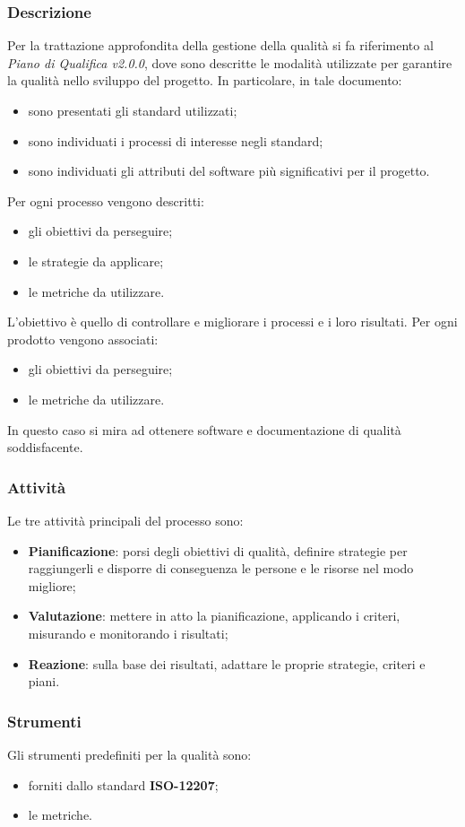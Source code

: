 	\subsubsection{Descrizione}
	Per la trattazione approfondita della gestione della qualità si fa riferimento al \textit{Piano di Qualifica v2.0.0}, dove sono descritte le modalità utilizzate per garantire la qualità nello sviluppo del progetto. In particolare, in tale documento:
	\begin{itemize}
		\item sono presentati gli standard utilizzati;
		\item sono individuati i processi di interesse negli standard;
		\item sono individuati gli attributi del software più significativi per il progetto.
	\end{itemize}
	Per ogni processo vengono descritti:
	\begin{itemize}
		\item gli obiettivi da perseguire;
		\item le strategie da applicare;
		\item le metriche da utilizzare.
	\end{itemize}
	L'obiettivo è quello di controllare e migliorare i processi e i loro risultati.
	Per ogni prodotto vengono associati:
	\begin{itemize}
		\item gli obiettivi da perseguire;
		\item le metriche da utilizzare.
	\end{itemize}
	In questo caso si mira ad ottenere software e documentazione di qualità soddisfacente.
	\subsubsection{Attività}
	Le tre attività principali del processo sono:
	\begin{itemize}
		\item \textbf{Pianificazione}: porsi degli obiettivi di qualità, definire strategie per raggiungerli e disporre di conseguenza le persone e le risorse nel modo migliore;
		\item \textbf{Valutazione}: mettere in atto la pianificazione, applicando i criteri, misurando e monitorando i risultati; 
		\item \textbf{Reazione}: sulla base dei risultati, adattare le proprie strategie, criteri e piani.
	\end{itemize}
	\subsubsection{Strumenti}
	Gli strumenti predefiniti per la qualità sono: 
	\begin{itemize}
		\item forniti dallo standard \textbf{ISO-12207};
		\item le metriche.
	\end{itemize}
